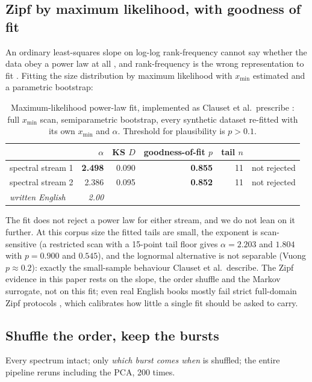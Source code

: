 \documentclass[11pt,a4paper]{article}
\newcommand{\bnum}[1]{\textbf{#1}}
\begin{document}
\subsection{Zipf by maximum likelihood, with goodness of fit}

An ordinary least-squares slope on log-log rank-frequency cannot say whether the data
obey a power law at all \cite{clauset2009}, and rank-frequency is the wrong
representation to fit \cite{corral2020}. Fitting the size distribution by maximum
likelihood with $x_{\min}$ estimated and a parametric bootstrap:

\begin{table}[htbp]
\centering
\caption{Maximum-likelihood power-law fit, implemented as Clauset et al.\ prescribe
\cite{clauset2009}: full $x_{\min}$ scan, semiparametric bootstrap, every synthetic
dataset re-fitted with its own $x_{\min}$ and $\alpha$. Threshold for plausibility is
$p > 0.1$.}
\label{tab:mle}
\begin{tabular}{lrrrrl}
\toprule
 & $\alpha$ & KS $D$ & goodness-of-fit $p$ & tail $n$ & \\
\midrule
spectral stream 1 & \bnum{2.498} & 0.090 & \bnum{0.855} & 11 & not rejected \\
spectral stream 2 & 2.386 & 0.095 & \bnum{0.852} & 11 & not rejected \\
\emph{written English} & \emph{2.00} & & & & \\
\bottomrule
\end{tabular}
\end{table}

The fit does not reject a power law for either stream, and we do not lean on it
further. At this corpus size the fitted tails are small, the exponent is
scan-sensitive (a restricted scan with a 15-point tail floor gives $\alpha = 2.203$
and $1.804$ with $p = 0.900$ and $0.545$), and the lognormal alternative is not
separable (Vuong $p \approx 0.2$): exactly the small-sample behaviour Clauset et al.\
describe. The Zipf evidence in this paper rests on the slope, the order shuffle and
the Markov surrogate, not on this fit; even real English books mostly fail strict
full-domain Zipf protocols \cite{moreno2016}, which calibrates how little a single
fit should be asked to carry.

\subsection{Shuffle the order, keep the bursts}

Every spectrum intact; only \emph{which burst comes when} is shuffled; the entire
pipeline reruns including the PCA, 200 times.
\end{document}
